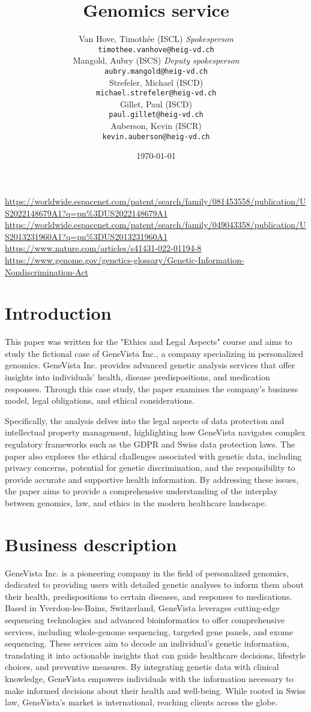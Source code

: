 \documentclass[a4paper]{article}
\title{Genomics service}
\date{\today}
\author{
    Van Hove, Timothée (ISCL) \textit{Spokesperson}\\\texttt{timothee.vanhove@heig-vd.ch}\\
    Mangold, Aubry (ISCS) \textit{Deputy spokesperson}\\\texttt{aubry.mangold@heig-vd.ch}\\
    Strefeler, Michael (ISCD)\\\texttt{michael.strefeler@heig-vd.ch}\\
    Gillet, Paul (ISCD)\\\texttt{paul.gillet@heig-vd.ch}\\
    Auberson, Kevin (ISCR)\\\texttt{kevin.auberson@heig-vd.ch}\\
}
\begin{document}
\urldef{\firstpat}\url{https://worldwide.espacenet.com/patent/search/family/081453558/publication/US2022148679A1?q=pn%3DUS2022148679A1}
\urldef{\secpat}\url{https://worldwide.espacenet.com/patent/search/family/049043358/publication/US2013231960A1?q=pn%3DUS2013231960A1}
\urldef{\discrimination}\url{https://www.nature.com/articles/s41431-022-01194-8}
\urldef{\gina}\url{https://www.genome.gov/genetics-glossary/Genetic-Information-Nondiscrimination-Act}
\maketitle
\newpage

\tableofcontents

\newpage

\section{Introduction}

This paper was written for the "Ethics and Legal Aspects" course and aims to study the fictional case of GeneVista Inc., a company specializing in personalized genomics. GeneVista Inc. provides advanced genetic analysis services that offer insights into individuals' health, disease predispositions, and medication responses. Through this case study, the paper examines the company's business model, legal obligations, and ethical considerations.

Specifically, the analysis delves into the legal aspects of data protection and intellectual property management, highlighting how GeneVista navigates complex regulatory frameworks such as the GDPR and Swiss data protection laws. The paper also explores the ethical challenges associated with genetic data, including privacy concerns, potential for genetic discrimination, and the responsibility to provide accurate and supportive health information. By addressing these issues, the paper aims to provide a comprehensive understanding of the interplay between genomics, law, and ethics in the modern healthcare landscape.

\section{Business description}

GeneVista Inc. is a pioneering company in the field of personalized genomics, dedicated to providing users with detailed genetic analyses to inform them about their health, predispositions to certain diseases, and responses to medications. Based in Yverdon-les-Bains, Switzerland, GeneVista leverages cutting-edge sequencing technologies and advanced bioinformatics to offer comprehensive services, including whole-genome sequencing, targeted gene panels, and exome sequencing. These services aim to decode an individual's genetic information, translating it into actionable insights that can guide healthcare decisions, lifestyle choices, and preventive measures. By integrating genetic data with clinical knowledge, GeneVista empowers individuals with the information necessary to make informed decisions about their health and well-being. While rooted in Swiss law, GeneVista's market is international, reaching clients across the globe.
\end{document}
